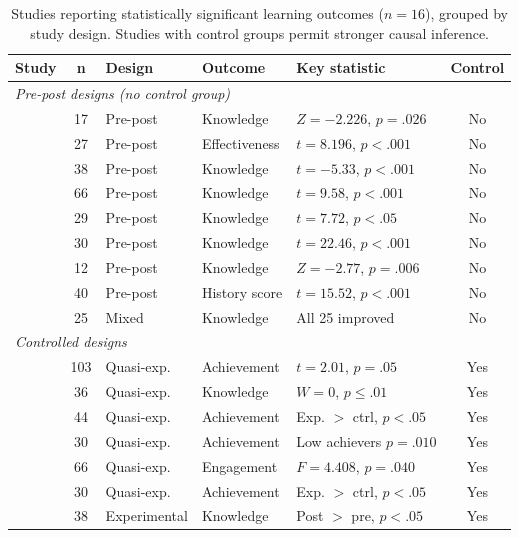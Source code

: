 \begin{table}[!h]
\centering
\caption{Studies reporting statistically significant learning outcomes ($n=16$), grouped by study design. Studies with control groups permit stronger causal inference.}
\label{tab:significant-learning}
\small
\begin{tabular}{p{2.5cm}@{\hskip 3pt}c@{\hskip 3pt}lllc}
\hline
\textbf{Study} & \textbf{n} & \textbf{Design} & \textbf{Outcome} & \textbf{Key statistic} & \textbf{Control} \\
\hline
\multicolumn{6}{l}{\textit{Pre-post designs (no control group)}} \\
\cite{1Barbatsis201159} & 17 & Pre-post & Knowledge & $Z = -2.226$, $p = .026$ & No \\
\cite{9Lin2018} & 27 & Pre-post & Effectiveness & $t = 8.196$, $p < .001$ & No \\
\cite{16Chen201447} & 38 & Pre-post & Knowledge & $t = -5.33$, $p < .001$ & No \\
\cite{19Chou2019} & 66 & Pre-post & Knowledge & $t = 9.58$, $p < .001$ & No \\
\cite{45Yu2015727} & 29 & Pre-post & Knowledge & $t = 7.72$, $p < .05$ & No \\
\cite{58Shih2015173} & 30 & Pre-post & Knowledge & $t = 22.46$, $p < .001$ & No \\
\cite{63Liu2021} & 12 & Pre-post & Knowledge & $Z = -2.77$, $p = .006$ & No \\
\cite{64Hsu201324} & 40 & Pre-post & History score & $t = 15.52$, $p < .001$ & No \\
\cite{71lynch2015pedagogical} & 25 & Mixed & Knowledge & All 25 improved & No \\
\hline
\multicolumn{6}{l}{\textit{Controlled designs}} \\
\citeauthor{8Yu2014}~\cite{8Yu2014} & 103 & Quasi-exp. & Achievement & $t = 2.01$, $p = .05$ & Yes \\
\cite{24Ghannem2019} & 36 & Quasi-exp. & Knowledge & $W = 0$, $p \leq .01$ & Yes \\
\cite{28Chao201734} & 44 & Quasi-exp. & Achievement & Exp. $>$ ctrl, $p < .05$ & Yes \\
\cite{52Lin2011265} & 30 & Quasi-exp. & Achievement & Low achievers $p = .010$ & Yes \\
\cite{66Rahmawati2023163} & 66 & Quasi-exp. & Engagement & $F = 4.408$, $p = .040$ & Yes \\
\cite{67Lin201296} & 30 & Quasi-exp. & Achievement & Exp. $>$ ctrl, $p < .05$ & Yes \\
\cite{79Fernes2024379} & 38 & Experimental & Knowledge & Post $>$ pre, $p < .05$ & Yes \\
\hline
\end{tabular}
\end{table}


